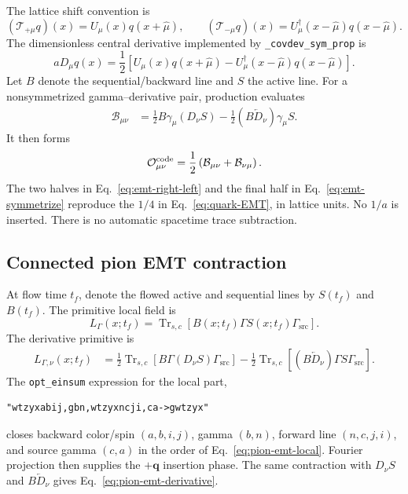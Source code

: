 \documentclass[11pt,a4paper]{article}
\numberwithin{equation}{section}
\newcommand{\Trsc}{\operatorname{Tr}_{s,c}}
\newcommand{\Gsrc}{\Gamma_{\mathrm{src}}}
\newcommand{\code}[1]{%
  \ifmmode\text{\texttt{\detokenize{#1}}}\else\nolinkurl{#1}\fi}
\begin{document}
The lattice shift convention is
\begin{equation}
 (\mathcal T_{+\mu}q)(x)=U_\mu(x)q(x+\hat\mu),\qquad
 (\mathcal T_{-\mu}q)(x)
 =U_\mu^\dagger(x-\hat\mu)q(x-\hat\mu).
 \label{eq:covariant-shifts}
\end{equation}
The dimensionless central derivative implemented by
\code{_covdev_sym_prop} is
\begin{equation}
 aD_\mu q(x)
 =\frac12\left[
 U_\mu(x)q(x+\hat\mu)
 -U_\mu^\dagger(x-\hat\mu)q(x-\hat\mu)
 \right].
 \label{eq:central-covdev}
\end{equation}
Let \(B\) denote the sequential/backward line and \(S\) the active line.  For
a nonsymmetrized gamma--derivative pair, production evaluates
\begin{align}
 \mathcal B_{\mu\nu}
 &=
 \frac12 B\gamma_\mu(D_\nu S)
 -\frac12 (B\overleftarrow D_\nu)\gamma_\mu S.
 \label{eq:emt-right-left}
\end{align}
It then forms
\begin{equation}
 \mathcal O_{\mu\nu}^{\rm code}
 =\frac12\left(\mathcal B_{\mu\nu}
                    +\mathcal B_{\nu\mu}\right).
 \label{eq:emt-symmetrize}
\end{equation}
The two halves in Eq.~\eqref{eq:emt-right-left} and the final half in
Eq.~\eqref{eq:emt-symmetrize} reproduce the \(1/4\) in
Eq.~\eqref{eq:quark-EMT}, in lattice units.  No \(1/a\) is inserted.  There
is no automatic spacetime trace subtraction.

\subsection{Connected pion EMT contraction}

At flow time \(t_f\), denote the flowed active and sequential lines by
\(S(t_f)\) and \(B(t_f)\).  The primitive local field is
\begin{equation}
 L_\Gamma(x;t_f)
 =\Trsc\left[B(x;t_f)\Gamma S(x;t_f)\Gsrc\right].
 \label{eq:pion-emt-local}
\end{equation}
The derivative primitive is
\begin{align}
 L_{\Gamma,\nu}(x;t_f)
 &=\frac12\Trsc\left[
 B\Gamma(D_\nu S)\Gsrc\right]
 -\frac12\Trsc\left[
 (B\overleftarrow D_\nu)\Gamma S\Gsrc\right].
 \label{eq:pion-emt-derivative}
\end{align}
The \code{opt_einsum} expression for the local part,
\begin{lstlisting}
"wtzyxabij,gbn,wtzyxncji,ca->gwtzyx"
\end{lstlisting}
closes backward color/spin \((a,b,i,j)\), gamma \((b,n)\), forward line
\((n,c,j,i)\), and source gamma \((c,a)\) in the order of
Eq.~\eqref{eq:pion-emt-local}.  Fourier projection then supplies the
\(+\boldsymbol q\) insertion phase.  The same contraction with \(D_\nu S\)
and \(B\overleftarrow D_\nu\) gives
Eq.~\eqref{eq:pion-emt-derivative}.
\end{document}
